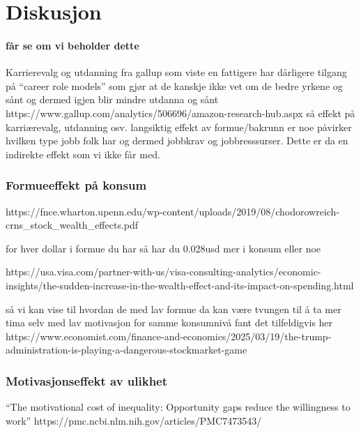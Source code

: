 \documentclass[
  12pt,
  a4paper,
  DIV=11,
  numbers=noendperiod]{scrartcl}
\let\oldparagraph\paragraph
\renewcommand{\paragraph}[1]{\oldparagraph{#1}\mbox{}}
\begin{document}
\newpage

\section{Diskusjon}\label{diskusjon}

\paragraph{får se om vi beholder
dette}\label{fuxe5r-se-om-vi-beholder-dette}

Karrierevalg og utdanning fra gallup som viste en fattigere har
dårligere tilgang på ``career role models'' som gjør at de kanskje ikke
vet om de bedre yrkene og sånt og dermed igjen blir mindre utdanna og
sånt https://www.gallup.com/analytics/506696/amazon-research-hub.aspx så
effekt på karriærevalg, utdanning osv. langsiktig effekt av
formue/bakrunn er noe påvirker hvilken type jobb folk har og dermed
jobbkrav og jobbresssurser. Dette er da en indirekte effekt som vi ikke
får med.

\subsubsection{Formueeffekt på konsum}\label{formueeffekt-puxe5-konsum}

https://fnce.wharton.upenn.edu/wp-content/uploads/2019/08/chodorowreich-crns\_stock\_wealth\_effects.pdf

for hver dollar i formue du har så har du 0.028usd mer i konsum eller
noe

https://usa.visa.com/partner-with-us/visa-consulting-analytics/economic-insights/the-sudden-increase-in-the-wealth-effect-and-its-impact-on-spending.html

så vi kan vise til hvordan de med lav formue da kan være tvungen til å
ta mer tima selv med lav motivasjon for samme konsumnivå fant det
tilfeldigvis her
https://www.economist.com/finance-and-economics/2025/03/19/the-trump-administration-is-playing-a-dangerous-stockmarket-game

\subsubsection{Motivasjonseffekt av
ulikhet}\label{motivasjonseffekt-av-ulikhet}

``The motivational cost of inequality: Opportunity gaps reduce the
willingness to work'' https://pmc.ncbi.nlm.nih.gov/articles/PMC7473543/
\end{document}
